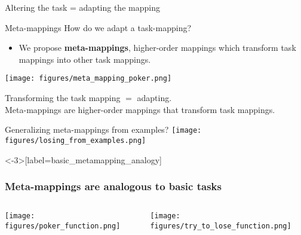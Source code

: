 \documentclass{beamer}
\begin{document}
\begin{frame}{Altering the task = adapting the mapping}
\end{frame}


\begin{frame}{Meta-mappings}
How do we adapt a task-mapping?
\begin{itemize}
\item We propose \textbf{meta-mappings}, higher-order mappings which transform task mappings into other task mappings.
\end{itemize}
\texttt{[image: figures/meta\_mapping\_poker.png]}
\end{frame}

\begin{frame}[standout]
Transforming the task mapping \(=\) adapting. \\[1em]
Meta-mappings are higher-order mappings that transform task mappings.
\end{frame}

\begin{frame}{Generalizing meta-mappings from examples?}
\centering
\texttt{[image: figures/losing\_from\_examples.png]}
\end{frame}

\begin{frame}<-3>[label=basic_metamapping_analogy]
\frametitle{Meta-mappings are analogous to basic tasks}
\begin{columns}
\begin{column}{0.5\textwidth}
\vspace{2em}
\texttt{[image: figures/poker\_function.png]}
\end{column}
\begin{column}{0.5\textwidth}
\vspace{2em}
\texttt{[image: figures/try\_to\_lose\_function.png]}
\end{column}
\end{columns}
\end{frame}
\end{document}
